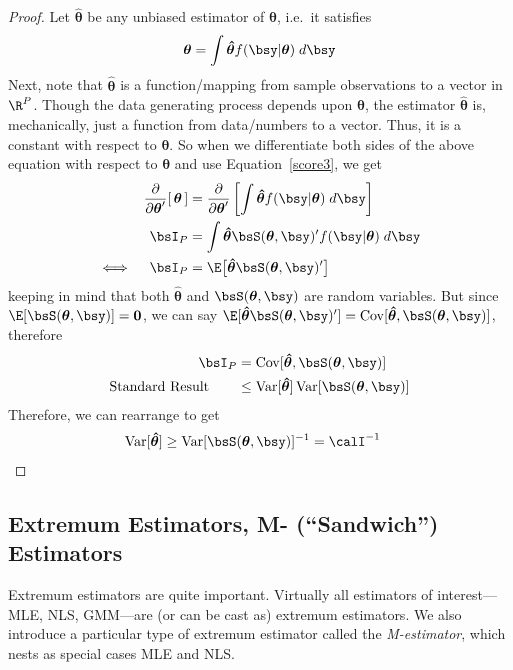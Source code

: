 \documentclass[12pt]{article}
\theoremstyle{plain}
\theoremstyle{definition}
\theoremstyle{remark}
\newcommand{\bstheta}{\boldsymbol{\theta}}
\newcommand{\bshattheta}{\boldsymbol{\hat{\theta}}}
\renewcommand{\bso}{\boldsymbol{0}}
\newcommand{\Cov}{\operatorname{Cov}}
\newcommand{\Var}{\operatorname{Var}}
\begin{document}
\begin{proof}
Let $\bshattheta$ be any unbiased estimator of $\bstheta$, i.e.\ it
satisfies
\begin{align*}
  \bstheta = \int \bshattheta f(\bsy|\bstheta) \; d\bsy
\end{align*}
Next, note that $\bshattheta$ is a function/mapping from sample
observations to a vector in $\R^P$. Though the data generating process
depends upon $\bstheta$, the estimator $\bshattheta$ is, mechanically,
just a function from data/numbers to a vector. Thus, it is a constant
with respect to $\bstheta$. So when we differentiate both sides of the
above equation with respect to $\bstheta$ and use Equation~\ref{score3},
we get
\begin{align*}
  \frac{\partial}{\partial\bstheta'}
  [\,
  \bstheta
  \,]
  &=
  \frac{\partial}{\partial\bstheta'}
  \left[
  \int \bshattheta f(\bsy|\bstheta) \; d\bsy
  \right]
  \\
  \bsI_P
  &= \int \bshattheta \bsS(\bstheta,\bsy)' f(\bsy|\bstheta)\; d\bsy \\
  \iff\quad
  \bsI_P
  &= \E\big[\bshattheta \bsS(\bstheta,\bsy)'\big]
\end{align*}
keeping in mind that both $\bshattheta$ and $\bsS(\bstheta,\bsy)$ are
random variables. But since $\E[\bsS(\bstheta,\bsy)]=\bso$, we can say
$\E[\bshattheta \bsS(\bstheta,\bsy)'] =
\Cov[\bshattheta,\bsS(\bstheta,\bsy)]$, therefore
\begin{align*}
  \bsI_P &=
  \Cov[\bshattheta,\bsS(\bstheta,\bsy)]
  \\
  \text{Standard Result} \qquad
  &\leq
  \Var[\bshattheta]\Var[\bsS(\bstheta,\bsy)]
\end{align*}
Therefore, we can rearrange to get
\begin{align*}
  \Var[\bshattheta]
  &\geq
  \Var[\bsS(\bstheta,\bsy)]^{-1}
  =\calI^{-1}
\end{align*}
\end{proof}


\clearpage
\subsection{Extremum Estimators, M- (``Sandwich'') Estimators}

Extremum estimators are quite important. Virtually all estimators of
interest---MLE, NLS, GMM---are (or can be cast as) extremum
estimators. We also introduce a particular type of extremum estimator
called the \emph{M-estimator}, which nests as special cases MLE and
NLS.
\end{document}
